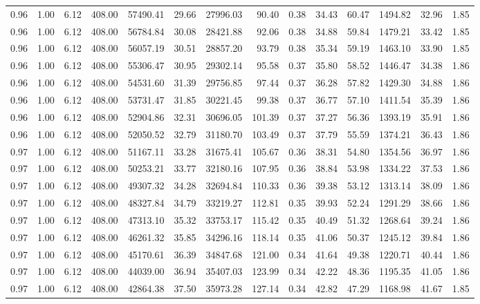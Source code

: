 \begin{table}[!ht]
\begin{tabular}{rrrrrrrrrrrrrr}
0.96 & 1.00 & 6.12 & 408.00 & 57490.41 & 29.66 & 27996.03 & 90.40 & 0.38 & 34.43 & 60.47 & 1494.82 & 32.96 & 1.85 \\
0.96 & 1.00 & 6.12 & 408.00 & 56784.84 & 30.08 & 28421.88 & 92.06 & 0.38 & 34.88 & 59.84 & 1479.21 & 33.42 & 1.85 \\
0.96 & 1.00 & 6.12 & 408.00 & 56057.19 & 30.51 & 28857.20 & 93.79 & 0.38 & 35.34 & 59.19 & 1463.10 & 33.90 & 1.85 \\
0.96 & 1.00 & 6.12 & 408.00 & 55306.47 & 30.95 & 29302.14 & 95.58 & 0.37 & 35.80 & 58.52 & 1446.47 & 34.38 & 1.86 \\
0.96 & 1.00 & 6.12 & 408.00 & 54531.60 & 31.39 & 29756.85 & 97.44 & 0.37 & 36.28 & 57.82 & 1429.30 & 34.88 & 1.86 \\
0.96 & 1.00 & 6.12 & 408.00 & 53731.47 & 31.85 & 30221.45 & 99.38 & 0.37 & 36.77 & 57.10 & 1411.54 & 35.39 & 1.86 \\
0.96 & 1.00 & 6.12 & 408.00 & 52904.86 & 32.31 & 30696.05 & 101.39 & 0.37 & 37.27 & 56.36 & 1393.19 & 35.91 & 1.86 \\
0.96 & 1.00 & 6.12 & 408.00 & 52050.52 & 32.79 & 31180.70 & 103.49 & 0.37 & 37.79 & 55.59 & 1374.21 & 36.43 & 1.86 \\
0.97 & 1.00 & 6.12 & 408.00 & 51167.11 & 33.28 & 31675.41 & 105.67 & 0.36 & 38.31 & 54.80 & 1354.56 & 36.97 & 1.86 \\
0.97 & 1.00 & 6.12 & 408.00 & 50253.21 & 33.77 & 32180.16 & 107.95 & 0.36 & 38.84 & 53.98 & 1334.22 & 37.53 & 1.86 \\
0.97 & 1.00 & 6.12 & 408.00 & 49307.32 & 34.28 & 32694.84 & 110.33 & 0.36 & 39.38 & 53.12 & 1313.14 & 38.09 & 1.86 \\
0.97 & 1.00 & 6.12 & 408.00 & 48327.84 & 34.79 & 33219.27 & 112.81 & 0.35 & 39.93 & 52.24 & 1291.29 & 38.66 & 1.86 \\
0.97 & 1.00 & 6.12 & 408.00 & 47313.10 & 35.32 & 33753.17 & 115.42 & 0.35 & 40.49 & 51.32 & 1268.64 & 39.24 & 1.86 \\
0.97 & 1.00 & 6.12 & 408.00 & 46261.32 & 35.85 & 34296.16 & 118.14 & 0.35 & 41.06 & 50.37 & 1245.12 & 39.84 & 1.86 \\
0.97 & 1.00 & 6.12 & 408.00 & 45170.61 & 36.39 & 34847.68 & 121.00 & 0.34 & 41.64 & 49.38 & 1220.71 & 40.44 & 1.86 \\
0.97 & 1.00 & 6.12 & 408.00 & 44039.00 & 36.94 & 35407.03 & 123.99 & 0.34 & 42.22 & 48.36 & 1195.35 & 41.05 & 1.86 \\
0.97 & 1.00 & 6.12 & 408.00 & 42864.38 & 37.50 & 35973.28 & 127.14 & 0.34 & 42.82 & 47.29 & 1168.98 & 41.67 & 1.85 \\

\end{tabular}
\end{table}
